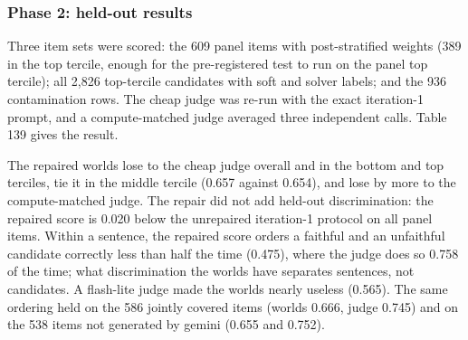 \documentclass[11pt,letterpaper]{article}
\begin{document}
\subsubsection{Phase 2: held-out results}

Three item sets were scored: the 609 panel items with post-stratified weights (389 in the top tercile, enough for the pre-registered test to run on the panel top tercile); all 2,826 top-tercile candidates with soft and solver labels; and the 936 contamination rows. The cheap judge was re-run with the exact iteration-1 prompt, and a compute-matched judge averaged three independent calls. Table 139 gives the result.

The repaired worlds lose to the cheap judge overall and in the bottom and top terciles, tie it in the middle tercile (0.657 against 0.654), and lose by more to the compute-matched judge. The repair did not add held-out discrimination: the repaired score is 0.020 below the unrepaired iteration-1 protocol on all panel items. Within a sentence, the repaired score orders a faithful and an unfaithful candidate correctly less than half the time (0.475), where the judge does so 0.758 of the time; what discrimination the worlds have separates sentences, not candidates. A flash-lite judge made the worlds nearly useless (0.565). The same ordering held on the 586 jointly covered items (worlds 0.666, judge 0.745) and on the 538 items not generated by gemini (0.655 and 0.752).
\end{document}

